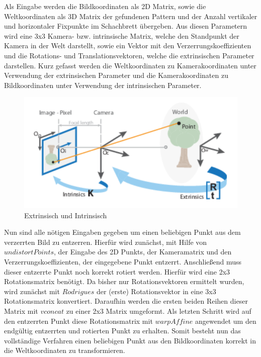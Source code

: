 Als Eingabe werden die Bildkoordinaten als 2D Matrix, sowie die Weltkoordinaten als 3D Matrix der gefundenen Pattern und der Anzahl vertikaler und horizontaler Fixpunkte im Schachbrett übergeben. Aus diesen Parametern wird eine 3x3 Kamera- bzw. intrinsische Matrix, welche den Standpunkt der Kamera in der Welt darstellt, sowie ein Vektor mit den Verzerrungskoeffizienten und die Rotations- und Translationsvektoren, welche die extrinsischen Parameter darstellen. Kurz gefasst werden die Weltkoordinaten zu Kamerakoordinaten unter Verwendung der extrinsischen Parameter und die Kamerakoordinaten zu Bildkoordinaten unter Verwendung der intrinsischen Parameter.
\begin{figure}[h]
	\centering
	\includegraphics[scale=1.3]{bilder/extrinIntrin.PNG}
	\caption{Extrinsisch und Intrinsisch}
\end{figure}
Nun sind alle nötigen Eingaben gegeben um einen beliebigen Punkt aus dem verzerrten Bild zu entzerren. Hierfür wird zunächst, mit Hilfe von $undistortPoints$, der Eingabe des 2D Punkts, der Kameramatrix und den Verzerrungskoeffizienten, der eingegebene Punkt entzerrt. Anschließend muss dieser entzerrte Punkt noch korrekt rotiert werden. Hierfür wird eine 2x3 Rotationsmatrix benötigt. Da bisher nur Rotationsvektoren ermittelt wurden, wird zunächst mit $Rodrigues$ der (erste) Rotationsvektor in eine 3x3 Rotationsmatrix konvertiert. Daraufhin werden die ersten beiden Reihen dieser Matrix mit $vconcat$ zu einer 2x3 Matrix umgeformt. Als letzten Schritt wird auf den entzerrten Punkt diese Rotationsmatrix mit $warpAffine$ angewendet um den endgültig entzerrten und rotierten Punkt zu erhalten. Somit besteht nun das vollständige Verfahren einen beliebigen Punkt aus den Bildkoordinaten korrekt in die Weltkoordinaten zu transformieren.

